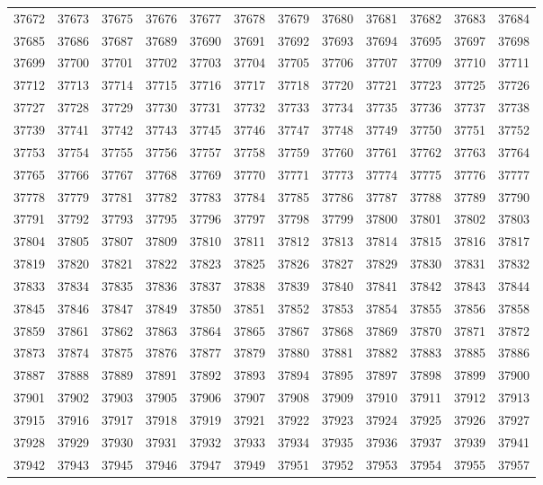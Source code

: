 \begin{center}
\begin{longtable}{llllllllllll}
37672 &37673 &37675 &37676 &37677 &37678 &37679 &37680 &37681 &37682 &37683 &37684 \\
37685 &37686 &37687 &37689 &37690 &37691 &37692 &37693 &37694 &37695 &37697 &37698 \\
37699 &37700 &37701 &37702 &37703 &37704 &37705 &37706 &37707 &37709 &37710 &37711 \\
37712 &37713 &37714 &37715 &37716 &37717 &37718 &37720 &37721 &37723 &37725 &37726 \\
37727 &37728 &37729 &37730 &37731 &37732 &37733 &37734 &37735 &37736 &37737 &37738 \\
37739 &37741 &37742 &37743 &37745 &37746 &37747 &37748 &37749 &37750 &37751 &37752 \\
37753 &37754 &37755 &37756 &37757 &37758 &37759 &37760 &37761 &37762 &37763 &37764 \\
37765 &37766 &37767 &37768 &37769 &37770 &37771 &37773 &37774 &37775 &37776 &37777 \\
37778 &37779 &37781 &37782 &37783 &37784 &37785 &37786 &37787 &37788 &37789 &37790 \\
37791 &37792 &37793 &37795 &37796 &37797 &37798 &37799 &37800 &37801 &37802 &37803 \\
37804 &37805 &37807 &37809 &37810 &37811 &37812 &37813 &37814 &37815 &37816 &37817 \\
37819 &37820 &37821 &37822 &37823 &37825 &37826 &37827 &37829 &37830 &37831 &37832 \\
37833 &37834 &37835 &37836 &37837 &37838 &37839 &37840 &37841 &37842 &37843 &37844 \\
37845 &37846 &37847 &37849 &37850 &37851 &37852 &37853 &37854 &37855 &37856 &37858 \\
37859 &37861 &37862 &37863 &37864 &37865 &37867 &37868 &37869 &37870 &37871 &37872 \\
37873 &37874 &37875 &37876 &37877 &37879 &37880 &37881 &37882 &37883 &37885 &37886 \\
37887 &37888 &37889 &37891 &37892 &37893 &37894 &37895 &37897 &37898 &37899 &37900 \\
37901 &37902 &37903 &37905 &37906 &37907 &37908 &37909 &37910 &37911 &37912 &37913 \\
37915 &37916 &37917 &37918 &37919 &37921 &37922 &37923 &37924 &37925 &37926 &37927 \\
37928 &37929 &37930 &37931 &37932 &37933 &37934 &37935 &37936 &37937 &37939 &37941 \\
37942 &37943 &37945 &37946 &37947 &37949 &37951 &37952 &37953 &37954 &37955 &37957 \\

\end{longtable}
\end{center}
